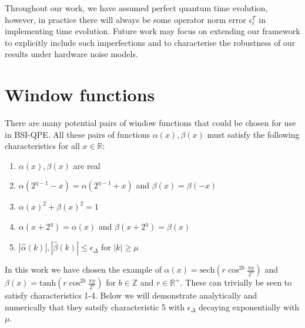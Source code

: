 \documentclass[aps,floatfix,10pt,amssymb,amsfont,amsmath,superscriptaddress,float,nofootinbib,longbibliography,nobalancelastpage,twocolumn]{revtex4-2}
\begin{document}
Throughout our work, we have assumed perfect quantum time evolution, however, in practice there will always be some operator norm error $\epsilon^T_t$ in implementing time evolution. Future work may focus on extending our framework to explicitly include such imperfections and to characterise the robustness of our results under hardware noise models.



\appendix
\onecolumngrid    
\section{Window functions}
\label{section:appendix}
There are many potential pairs of window functions that could be chosen for use in BSI-QPE. All these pairs of functions $\alpha(x), \beta(x)$ must satisfy the following characteristics for all $x \in \mathbb{R}$:
\begin{enumerate}
    \item $\alpha(x), \beta(x)$ are real
    \item $\alpha(2^{\eta-1}-x) = \alpha(2^{\eta-1}+x)$ and $\beta(x) = \beta(-x)$
    \item $\alpha(x)^2+\beta(x)^2 =1$
    \item $\alpha(x+2^{\eta}) = \alpha(x)$ and $\beta(x+2^{\eta}) = \beta(x)$
    \item $|\hat \alpha(k)|, |\hat \beta(k)| \leq \epsilon_\Delta$ for $|k| \geq \mu$
\end{enumerate}
In this work we have chosen the example of $\alpha(x) = \text{sech}( r\cos^{2b} \frac{\pi x}{2^{\eta}})$ and $\beta(x) = \text{tanh}(r \cos^{2b} \frac{\pi x}{2^{\eta}})$ for $b \in \mathbb{Z}$ and $r \in \mathbb{R}^+$. These can trivially be seen to satisfy characteristics 1-4. Below we will demonstrate analytically and numerically that they satsify characteristic 5 with $\epsilon_{\Delta}$ decaying exponentially with $\mu$.
\end{document}
